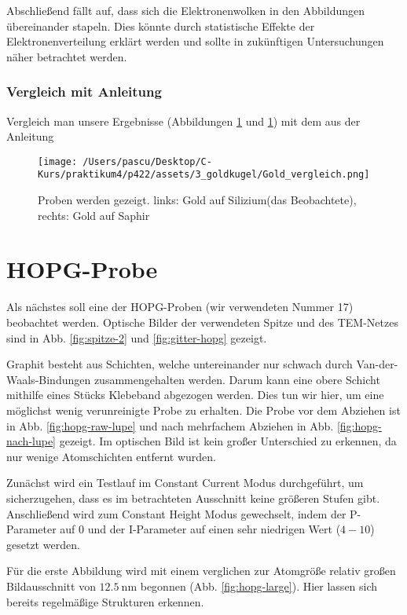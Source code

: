 \documentclass{article}
\begin{document}
Abschließend fällt auf, dass sich die Elektronenwolken in den Abbildungen übereinander stapeln. Dies könnte durch statistische Effekte der Elektronenverteilung erklärt werden und sollte in zukünftigen Untersuchungen näher betrachtet werden.

\subsubsection*{Vergleich mit Anleitung}

Vergleich man unsere Ergebnisse (Abbildungen \ref*{} und \ref*{}) mit dem aus der Anleitung \cite{Anleitung} 

\begin{figure}[h!]
    \centering
    \texttt{[image: /Users/pascu/Desktop/C-Kurs/praktikum4/p422/assets/3\_goldkugel/Gold\_vergleich.png]}
    \caption{Proben werden gezeigt. links: Gold auf Silizium(das Beobachtete), rechts: Gold auf Saphir}
    \label{fig:goldkugel_vergleich}
  \end{figure}

\newpage
\section{HOPG-Probe}
Als nächstes soll eine der HOPG-Proben (wir verwendeten Nummer 17) beobachtet werden. 
Optische Bilder der verwendeten Spitze und des TEM-Netzes sind in Abb. \ref{fig:spitze-2} und \ref{fig:gitter-hopg} gezeigt.


Graphit besteht aus Schichten, welche untereinander nur schwach durch Van-der-Waals-Bindungen
zusammengehalten werden. Darum kann eine obere Schicht mithilfe eines Stücks Klebeband abgezogen werden.
Dies tun wir hier, um eine möglichst wenig verunreinigte Probe zu erhalten. Die Probe vor dem
Abziehen ist in Abb. \ref{fig:hopg-raw-lupe} und nach mehrfachem Abziehen in Abb. \ref{fig:hopg-nach-lupe}
gezeigt. Im optischen Bild ist kein großer Unterschied zu erkennen, da nur wenige Atomschichten entfernt wurden.



Zunächst wird ein Testlauf im Constant Current Modus durchgeführt, um sicherzugehen, dass
es im betrachteten Ausschnitt keine größeren Stufen gibt.
Anschließend wird zum Constant Height Modus gewechselt, indem der P-Parameter auf $0$ und der
I-Parameter auf einen sehr niedrigen Wert ($4 - 10$) gesetzt werden.

Für die erste Abbildung wird mit einem verglichen zur Atomgröße relativ großen Bildausschnitt von $\SI{12.5}{\nm}$ begonnen (Abb. \ref{fig:hopg-large}). Hier lassen sich bereits regelmäßige Strukturen erkennen.
\end{document}
